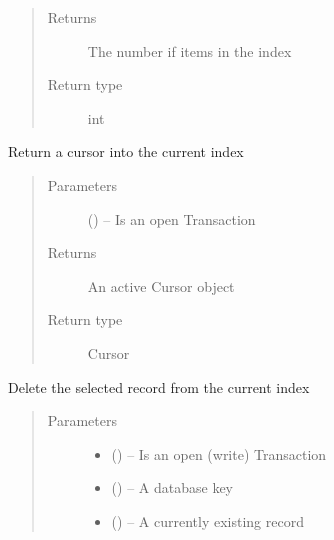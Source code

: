\documentclass[letterpaper,10pt,english]{sphinxmanual}
\begin{document}
\begin{fulllineitems}
\begin{fulllineitems}
\begin{quote}
\begin{description}
\item[{Returns}] \leavevmode
The number if items in the index

\item[{Return type}] \leavevmode
int

\end{description}\end{quote}

\end{fulllineitems}


\begin{fulllineitems}
\label{\detokenize{index:mamba.Index.cursor}}
Return a cursor into the current index
\begin{quote}\begin{description}
\item[{Parameters}] \leavevmode
{} () -- Is an open Transaction

\item[{Returns}] \leavevmode
An active Cursor object

\item[{Return type}] \leavevmode
Cursor

\end{description}\end{quote}

\end{fulllineitems}


\begin{fulllineitems}
\label{\detokenize{index:mamba.Index.delete}}
Delete the selected record from the current index
\begin{quote}\begin{description}
\item[{Parameters}] \leavevmode\begin{itemize}
\item {} 
 () -- Is an open (write) Transaction

\item {} 
 () -- A database key

\item {} 
 () -- A currently existing record


\end{itemize}
\end{description}
\end{quote}
\end{fulllineitems}
\end{fulllineitems}
\end{document}
